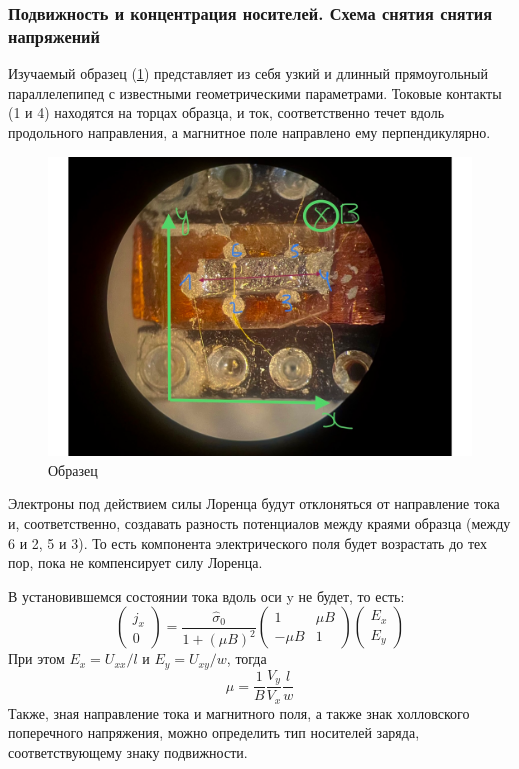 \documentclass[a4paper, 12pt]{article}
\begin{document}
\subsubsection{Подвижность и концентрация носителей. Схема снятия снятия напряжений}
Изучаемый образец (\ref{fig:3_sample2}) представляет из себя узкий и длинный прямоугольный параллелепипед с известными геометрическими параметрами. Токовые контакты (1 и 4) находятся на торцах образца, и ток, соответственно течет вдоль продольного направления, а магнитное поле направлено ему перпендикулярно.

\begin{figure}[H]
	\centering
	\includegraphics[width=\linewidth]{3_Sample2.pdf}
	\caption{Образец}
	\label{fig:3_sample2}
\end{figure}
Электроны под действием силы Лоренца будут отклоняться от направление тока и, соответственно, создавать разность потенциалов между краями образца (между 6 и 2, 5 и 3). То есть компонента электрического поля будет возрастать до тех пор, пока не компенсирует силу Лоренца. 

В установившемся состоянии тока вдоль оси y не будет, то есть: 
\begin{equation}
	\left(\begin{array}{c}
		j_x \\
		0
	\end{array}\right)=\frac{\hat{\sigma}_{0}}{1+(\mu B)^{2}}\left(\begin{array}{cc}
		1 & \mu B \\
		-\mu B & 1
	\end{array}\right)\left(\begin{array}{c}
		E_{x} \\
		E_{y}
	\end{array}\right)
\end{equation}
При этом $E_x=U_{xx}/l$ и $E_y=U_{xy}/w$, тогда
\begin{equation}
	\mu=\frac{1}{B}\frac{V_y}{V_x}\frac{l}{w}
\end{equation}
Также, зная направление тока и магнитного поля, а также знак холловского поперечного напряжения, можно определить тип носителей заряда, соответствующему знаку подвижности.
\end{document}
